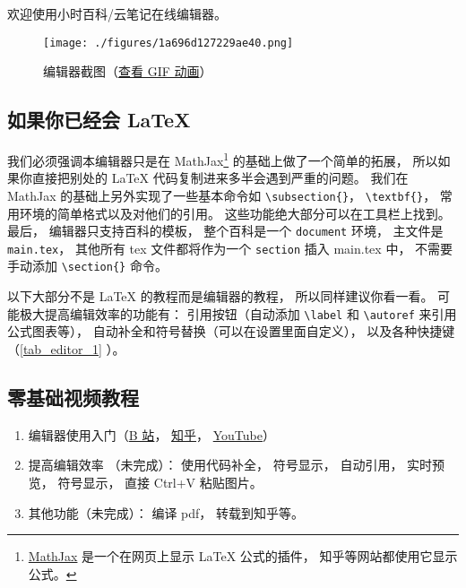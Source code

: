 
欢迎使用小时百科/云笔记在线编辑器。
\begin{figure}[ht]
\centering
\texttt{[image: ./figures/1a696d127229ae40.png]}
\caption{编辑器截图（\href{https://wuli.wiki/apps/editor.gif}{查看 GIF 动画}）} \label{fig_editor_3}
\end{figure}

\subsection{如果你已经会 LaTeX}
我们必须强调本编辑器只是在 MathJax\footnote{\href{https://www.mathjax.org/}{MathJax} 是一个在网页上显示 LaTeX 公式的插件， 知乎等网站都使用它显示公式。} 的基础上做了一个简单的拓展， 所以如果你直接把别处的 LaTeX 代码复制进来多半会遇到严重的问题。 我们在 MathJax 的基础上另外实现了一些基本命令如 \verb|\subsection{}|， \verb|\textbf{}|， 常用环境的简单格式以及对他们的引用。 这些功能绝大部分可以在工具栏上找到。 最后， 编辑器只支持百科的模板， 整个百科是一个 \verb|document| 环境， 主文件是 \verb|main.tex|， 其他所有 tex 文件都将作为一个 \verb|section| 插入 main.tex 中， 不需要手动添加 \verb|\section{}| 命令。

以下大部分不是 LaTeX 的教程而是编辑器的教程， 所以同样建议你看一看。 可能极大提高编辑效率的功能有： 引用按钮（自动添加 \verb|\label| 和 \verb|\autoref| 来引用公式图表等）， 自动补全和符号替换（可以在设置里面自定义）， 以及各种快捷键（\autoref{tab_editor_1} ）。

\subsection{零基础视频教程}
\begin{enumerate}
\item 编辑器使用入门（\href{https://www.bilibili.com/video/av87698355/}{B 站}， \href{https://zhuanlan.zhihu.com/p/105869878}{知乎}， \href{https://www.youtube.com/watch?v=AN2tXNanD9U&t=1s}{YouTube}）
\item 提高编辑效率 （未完成）： 使用代码补全， 符号显示， 自动引用， 实时预览， 符号显示， 直接 Ctrl+V 粘贴图片。
\item 其他功能（未完成）： 编译 pdf， 转载到知乎等。
\end{enumerate}

